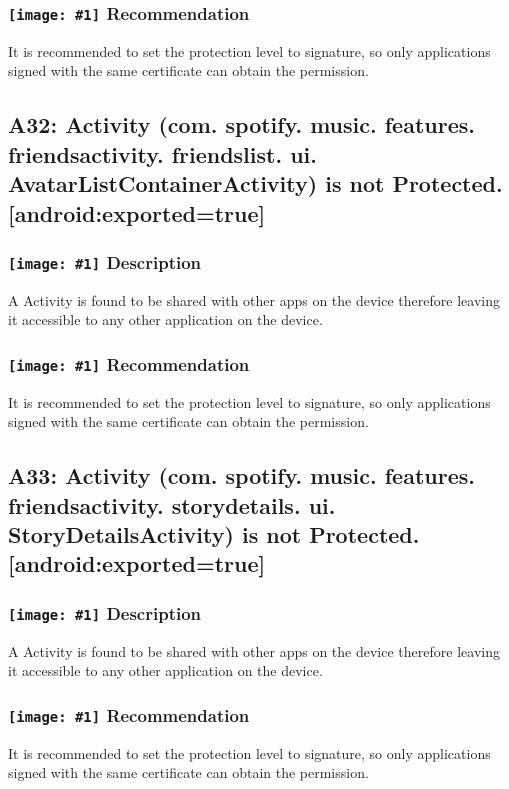 \documentclass[12p]{article}
\newcommand{\icon}[1]{\texttt{[image: \#1]}}
\begin{document}
\subsubsection*{\protect\icon{/home/miki/Documents/GITHUB/AndroidPermissions/python/vulns/report_icons/basic_todo.png} Recommendation}
It is recommended to set the protection level to signature, so only applications signed with the same certificate can obtain the permission.
\subsection{A32: Activity (com. spotify. music. features. friendsactivity. friendslist. ui. AvatarListContainerActivity) is not Protected. [android:exported=true]}
\subsubsection*{\protect\icon{/home/miki/Documents/GITHUB/AndroidPermissions/python/vulns/report_icons/basic_sheet.png} Description}
A Activity is found to be shared with other apps on the device therefore leaving it accessible to any other application on the device.
\subsubsection*{\protect\icon{/home/miki/Documents/GITHUB/AndroidPermissions/python/vulns/report_icons/basic_todo.png} Recommendation}
It is recommended to set the protection level to signature, so only applications signed with the same certificate can obtain the permission.
\subsection{A33: Activity (com. spotify. music. features. friendsactivity. storydetails. ui. StoryDetailsActivity) is not Protected. [android:exported=true]}
\subsubsection*{\protect\icon{/home/miki/Documents/GITHUB/AndroidPermissions/python/vulns/report_icons/basic_sheet.png} Description}
A Activity is found to be shared with other apps on the device therefore leaving it accessible to any other application on the device.
\subsubsection*{\protect\icon{/home/miki/Documents/GITHUB/AndroidPermissions/python/vulns/report_icons/basic_todo.png} Recommendation}
It is recommended to set the protection level to signature, so only applications signed with the same certificate can obtain the permission.
\end{document}
